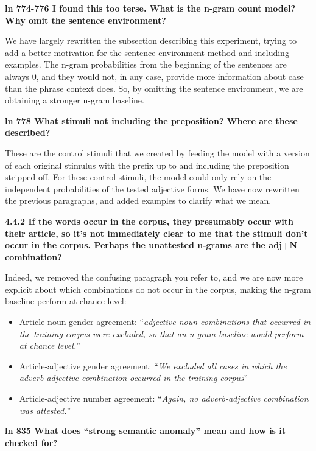 \documentclass{article}
\begin{document}
\textbf{ln 774-776 I found this too terse. What is the n-gram count model? Why omit the sentence environment?}

We have largely rewritten the subsection describing this experiment, trying to add a better motivation for the sentence environment method and including examples. The n-gram probabilities from the beginning of the sentences are always 0, and they would not, in any case, provide more information about case than the phrase context does. So, by omitting the sentence environment, we are obtaining a stronger n-gram baseline.
\newline

\textbf{ln 778 What stimuli not including the preposition? Where are these described?}

These are the control stimuli that we created by feeding the model with a version of each original stimulus with the prefix up to and including the preposition stripped off. For these control stimuli, the model could only rely on the independent probabilities of the tested adjective forms. We have now rewritten the previous paragraphs, and added examples to clarify what we mean.
\newline

\textbf{4.4.2 If the words occur in the corpus, they presumably occur with their article, so it's not immediately clear to me that the stimuli don't occur in the corpus. Perhaps the unattested n-grams are the adj+N combination?}

Indeed, we removed the confusing paragraph you refer to, and we are now more explicit about which combinations do not occur in the corpus, making the n-gram baseline perform at chance level:
\begin{itemize}
\item Article-noun gender agreement: ``\textit{adjective-noun combinations that occurred in the training corpus were excluded, so that an n-gram baseline would perform at chance level.}''
\item Article-adjective gender agreement: ``\textit{We excluded all cases in which the adverb-adjective combination occurred in the training corpus}''
\item Article-adjective number agreement: ``\textit{Again, no adverb-adjective combination was attested.}''\newline
\end{itemize}

\textbf{ln 835 What does ``strong semantic anomaly'' mean and how is it checked for?}
\end{document}
